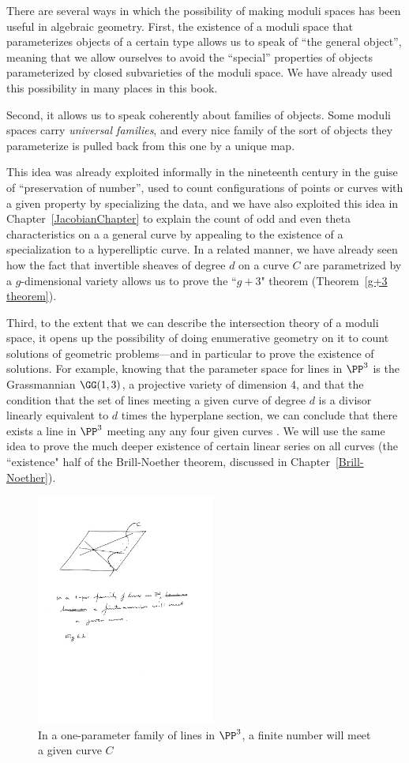 There are several ways in which the possibility of making moduli spaces has been useful in algebraic geometry. First, the existence of a moduli space that  parameterizes objects of a certain type allows us to speak of ``the general object'', meaning that we allow ourselves to avoid the ``special'' properties of objects parameterized by closed subvarieties of the moduli space. We have already used this
possibility in many places in this book. 

Second, it allows us to speak coherently about
families of objects. Some moduli spaces carry \emph{universal families}, and every nice family of the sort of objects
they parameterize is pulled back from this one by a unique map.  

This idea was already exploited informally in the nineteenth century in the guise of ``preservation of number'', used to count configurations of points or curves with a given property by specializing the 
data, and we have also exploited this idea in
Chapter~\ref{JacobianChapter} to explain the count of odd and even theta characteristics on a a general curve by appealing to the existence of a specialization to a hyperelliptic curve. In a related manner, we have already seen how the fact that invertible sheaves of degree $d$ on a curve $C$ are parametrized by a $g$-dimensional variety allows us to prove the ``$g+3$" theorem (Theorem~\ref{g+3 theorem}).

Third, to the extent that we can describe the intersection theory of a moduli space, it opens up the possibility of doing enumerative geometry on it to count solutions of geometric problems---and in particular to prove the existence of solutions. For example, knowing that the parameter space for lines in $\PP^3$ is the Grassmannian $\GG(1,3)$, a projective variety of dimension 4, and that the condition that the set of lines meeting a given curve of degree $d$
is a divisor linearly equivalent to  $d$ times the hyperplane section, we can conclude  that there exists a line in $\PP^3$ meeting any any four given curves \cite[Section 3.4.1]{3264}. We will use the same idea to prove the much deeper existence of certain linear series on all curves (the ``existence" half of the Brill-Noether theorem, discussed in Chapter~\ref{Brill-Noether}). 

\begin{figure}
 \caption{In a one-parameter family of lines in $\PP^3$, a finite number will meet a given curve $C$}
\centerline {\includegraphics[height=3in]{"Fig6.2.pdf"}}
\end{figure}

